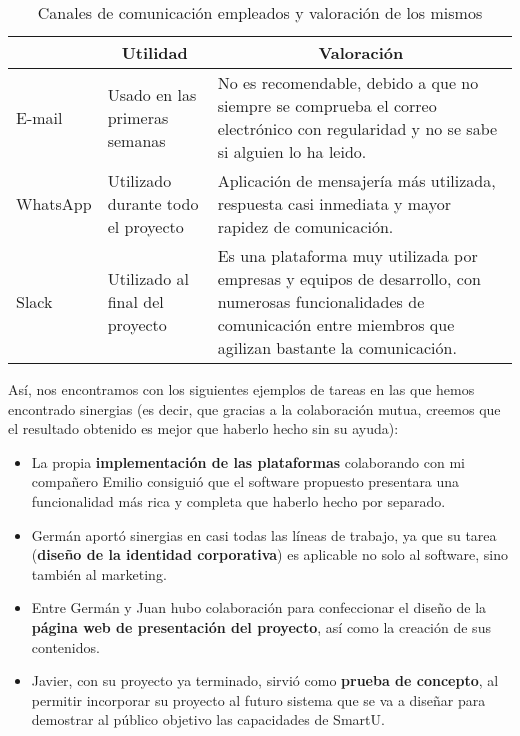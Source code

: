 \begin{table}
    \begin{center}
        \begin{tabular}{|l|p{3cm}|p{5cm}|}
            \hline
                \rowcolor{Gray}\multicolumn{1}{|c|}{\textbf{Canal}}
                & \multicolumn{1}{|c|}{\textbf{Utilidad}} & \multicolumn{1}{|c|}{\textbf{Valoración}} \\
            \hline
                E-mail & Usado en las primeras semanas & No es recomendable, debido a que no siempre se comprueba el correo electrónico con regularidad y no se sabe si alguien lo ha leido. \\
            \hline
                WhatsApp \cite{whatsapp} & Utilizado durante todo el proyecto & Aplicación de mensajería más utilizada, respuesta casi inmediata y mayor rapidez de comunicación. \\
            \hline
                Slack \cite{slack} & Utilizado al final del proyecto & Es una plataforma muy utilizada por empresas y equipos de desarrollo, con numerosas funcionalidades de comunicación entre miembros que agilizan bastante la comunicación. \\
            \hline
        \end{tabular}

        \caption{Canales de comunicación empleados y valoración de los mismos}
        \label{canalescomunicacion}
    \end{center}
\end{table}

















Así, nos encontramos con los siguientes ejemplos de tareas en las que hemos encontrado sinergias (es decir, que gracias a la colaboración mutua, creemos que el resultado obtenido es mejor que haberlo hecho sin su ayuda):

\begin{itemize}
    \item La propia \textbf{implementación de las plataformas} colaborando con mi compañero Emilio consiguió que el software propuesto presentara una funcionalidad más rica y completa que haberlo hecho por separado.
    \item Germán aportó sinergias en casi todas las líneas de trabajo, ya que su tarea (\textbf{diseño de la identidad corporativa}) es aplicable no solo al software, sino también al marketing.
    \item Entre Germán y Juan hubo colaboración para confeccionar el diseño de la \textbf{página web de presentación del proyecto}, así como la creación de sus contenidos.
    \item Javier, con su proyecto ya terminado, sirvió como \textbf{prueba de concepto}, al permitir incorporar su proyecto al futuro sistema que se va a diseñar para demostrar al público objetivo las capacidades de SmartU.
\end{itemize}

